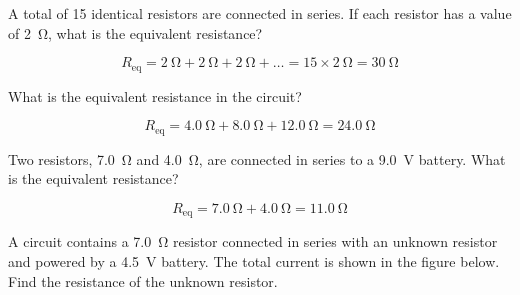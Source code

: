 \documentclass[answers]{exam}
\begin{document}
\begin{questions}
\question
A total of 15 identical resistors are connected in series. If each resistor has a value of \SI{2}{\ohm}, what is the equivalent resistance?

\begin{solution}

\begin{equation*}
    R_\text{eq} = \SI{2}{\ohm} + \SI{2}{\ohm} + \SI{2}{\ohm} + \ldots = 15\times \SI{2}{\ohm} = \boxed{\SI{30}{\ohm}}    
\end{equation*}
\end{solution}

\question 
What is the equivalent resistance in the circuit?

\begin{center}
\end{center}



\begin{solution}
\begin{equation*}
    R_\mathrm{eq} = \SI{4.0}{\ohm} + \SI{8.0}{\ohm} + \SI{12.0}{\ohm} = \boxed{\SI{24.0}{\ohm}}
\end{equation*}
\end{solution}



\question
Two resistors, \SI{7.0}{\ohm} and \SI{4.0}{\ohm}, are connected in series to a \SI{9.0}{V} battery. What is the equivalent resistance?

\begin{solution}
\begin{equation*}
    R_\mathrm{eq} = \SI{7.0}{\ohm} + \SI{4.0}{\ohm} = \boxed{\SI{11.0}{\ohm}}
\end{equation*}
\end{solution}



\question
A circuit contains a \SI{7.0}{\ohm} resistor connected in series with an unknown resistor and powered by a \SI{4.5}{V} battery. The total current is shown in the figure below. Find the resistance of the unknown resistor.

\begin{center}
\end{center}



\end{questions}
\end{document}
